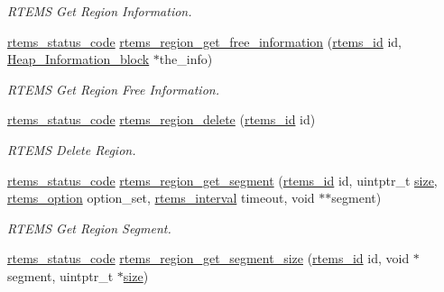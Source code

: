 \begin{DoxyCompactItemize}
\begin{DoxyCompactList}\small\item\em R\+T\+E\+MS Get Region Information. \end{DoxyCompactList}\item 
\mbox{\hyperlink{group__ClassicStatus_ga545d41846817eaba6143d52ee4d9e9fe}{rtems\+\_\+status\+\_\+code}} \mbox{\hyperlink{group__ClassicRegion_ga30893b36778c4b55d2e38ecd36a8a5a2}{rtems\+\_\+region\+\_\+get\+\_\+free\+\_\+information}} (\mbox{\hyperlink{group__ClassicTasks_gab20892b814dced7dd4e5b9bf42becd57}{rtems\+\_\+id}} id, \mbox{\hyperlink{structHeap__Information__block}{Heap\+\_\+\+Information\+\_\+block}} $\ast$the\+\_\+info)
\begin{DoxyCompactList}\small\item\em R\+T\+E\+MS Get Region Free Information. \end{DoxyCompactList}\item 
\mbox{\hyperlink{group__ClassicStatus_ga545d41846817eaba6143d52ee4d9e9fe}{rtems\+\_\+status\+\_\+code}} \mbox{\hyperlink{group__ClassicRegion_ga3fe54d7a4ca52287e94975d76540a893}{rtems\+\_\+region\+\_\+delete}} (\mbox{\hyperlink{group__ClassicTasks_gab20892b814dced7dd4e5b9bf42becd57}{rtems\+\_\+id}} id)
\begin{DoxyCompactList}\small\item\em R\+T\+E\+MS Delete Region. \end{DoxyCompactList}\item 
\mbox{\hyperlink{group__ClassicStatus_ga545d41846817eaba6143d52ee4d9e9fe}{rtems\+\_\+status\+\_\+code}} \mbox{\hyperlink{group__ClassicRegion_gad3240219844e408370c42dc123fd0d31}{rtems\+\_\+region\+\_\+get\+\_\+segment}} (\mbox{\hyperlink{group__ClassicTasks_gab20892b814dced7dd4e5b9bf42becd57}{rtems\+\_\+id}} id, uintptr\+\_\+t \mbox{\hyperlink{sun4u_2tte_8h_a245260f6f74972558f61b85227df5aae}{size}}, \mbox{\hyperlink{group__ClassicOptions_gad26685eb0e60a9650082935c31920e29}{rtems\+\_\+option}} option\+\_\+set, \mbox{\hyperlink{group__ClassicTasks_gad39c43f949683d46874e3a5586b93aee}{rtems\+\_\+interval}} timeout, void $\ast$$\ast$segment)
\begin{DoxyCompactList}\small\item\em R\+T\+E\+MS Get Region Segment. \end{DoxyCompactList}\item 
\mbox{\hyperlink{group__ClassicStatus_ga545d41846817eaba6143d52ee4d9e9fe}{rtems\+\_\+status\+\_\+code}} \mbox{\hyperlink{group__ClassicRegion_gac69357165b471f2f9bd9234f2916272f}{rtems\+\_\+region\+\_\+get\+\_\+segment\+\_\+size}} (\mbox{\hyperlink{group__ClassicTasks_gab20892b814dced7dd4e5b9bf42becd57}{rtems\+\_\+id}} id, void $\ast$segment, uintptr\+\_\+t $\ast$\mbox{\hyperlink{sun4u_2tte_8h_a245260f6f74972558f61b85227df5aae}{size}})
$$
\end{DoxyCompactItemize}
